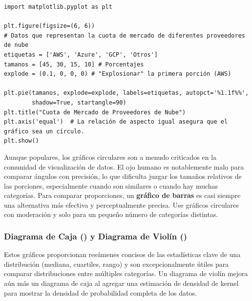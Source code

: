 \begin{example}
\text{ }\begin{verbatim}
import matplotlib.pyplot as plt

plt.figure(figsize=(6, 6))
# Datos que representan la cuota de mercado de diferentes proveedores de nube
etiquetas = ['AWS', 'Azure', 'GCP', 'Otros']
tamanos = [45, 30, 15, 10] # Porcentajes
explode = (0.1, 0, 0, 0) # "Explosionar" la primera porción (AWS)

plt.pie(tamanos, explode=explode, labels=etiquetas, autopct='%1.1f%%',
        shadow=True, startangle=90)
plt.title("Cuota de Mercado de Proveedores de Nube")
plt.axis('equal')  # La relación de aspecto igual asegura que el gráfico sea un círculo.
plt.show()
\end{verbatim}
\end{example}

\begin{remark}
Aunque populares, los gráficos circulares son a menudo criticados en la comunidad de visualización de datos. El ojo humano es notablemente malo para comparar ángulos con precisión, lo que dificulta juzgar los tamaños relativos de las porciones, especialmente cuando son similares o cuando hay muchas categorías. Para comparar proporciones, un \textbf{gráfico de barras} es casi siempre una alternativa más efectiva y perceptualmente precisa. Use gráficos circulares con moderación y solo para un pequeño número de categorías distintas.
\end{remark}

\subsubsection*{Diagrama de Caja () y Diagrama de Violín ()}
Estos gráficos proporcionan resúmenes concisos de las estadísticas clave de una distribución (mediana, cuartiles, rango) y son excepcionalmente útiles para comparar distribuciones entre múltiples categorías. Un diagrama de violín mejora aún más un diagrama de caja al agregar una estimación de densidad de kernel para mostrar la densidad de probabilidad completa de los datos.

